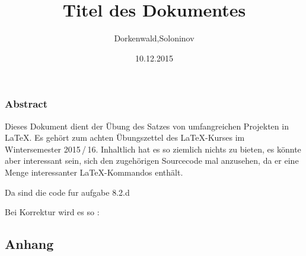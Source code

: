 \documentclass{scrreprt}
\newcommand*{\Path}{./inhalte}
\begin{document}
	\extratitle{Schmutztitel \\ Dorkenwald,Soloninov}

	\title{Titel des Dokumentes}
	\author{Dorkenwald,Soloninov}
	\date{10.12.2015}
	\maketitle

	\tableofcontents
	\newpage

	\subsection*{Abstract}
Dieses Dokument dient der Übung des Satzes von umfangreichen Projekten in \LaTeX{}. Es gehört zum achten Übungszettel des \LaTeX-Kurses im Wintersemester 	2015\,/\,16. Inhaltlich hat es so ziemlich nichts zu bieten, es könnte aber interessant sein, sich den zugehörigen Sourcecode mal anzusehen, da er eine Menge interessanter \LaTeX-Kommandos enthält.

	
			
	
	
	Da sind die code fur aufgabe 8.2.d
	
	\label{lst:RatedProvider}
	
	\label{lst:MovieProvider}
	
	\newpage
	Bei Korrektur wird es so : 


	\begin{appendix}
		\chapter*{Anhang}
		\printindex
		\listoffigures
		\listoftables
		\lstlistoflistings
	\end{appendix}
\end{document}
